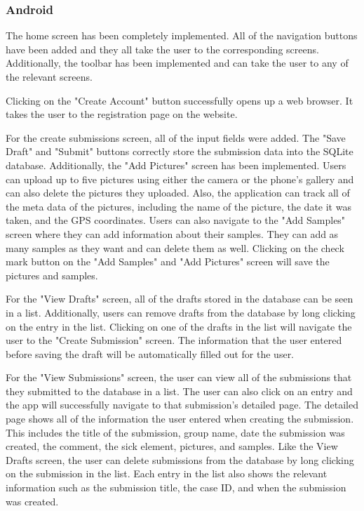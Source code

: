\documentclass[onecolumn, draftclsnofoot,10pt, compsoc]{IEEEtran}
\begin{document}
\subsubsection{Android}
The home screen has been completely implemented. All of the navigation buttons have been added and they all take the user to the corresponding screens. Additionally, the toolbar has been implemented and can take the user to any of the relevant screens.

Clicking on the "Create Account" button successfully opens up a web browser. It takes the user to the registration page on the website.

For the create submissions screen, all of the input fields were added. The "Save Draft" and "Submit" buttons correctly store the submission data into the SQLite database. Additionally, the "Add Pictures" screen has been implemented. Users can upload up to five pictures using either the camera or the phone's gallery and can also delete the pictures they uploaded. Also, the application can track all of the meta data of the pictures, including the name of the picture, the date it was taken, and the GPS coordinates. Users can also navigate to the "Add Samples" screen where they can add information about their samples. They can add as many samples as they want and can delete them as well. Clicking on the check mark button on the "Add Samples" and "Add Pictures" screen will save the pictures and samples.

For the "View Drafts" screen, all of the drafts stored in the database can be seen in a list. Additionally, users can remove drafts from the database by long clicking on the entry in the list. Clicking on one of the drafts in the list will navigate the user to the "Create Submission" screen. The information that the user entered before saving the draft will be automatically filled out for the user.

For the "View Submissions" screen, the user can view all of the submissions that they submitted to the database in a list. The user can also click on an entry and the app will successfully navigate to that submission's detailed page. The detailed page shows all of the information the user entered when creating the submission. This includes the title of the submission, group name, date the submission was created, the comment, the sick element, pictures, and samples. Like the View Drafts screen, the user can delete submissions from the database by long clicking on the submission in the list. Each entry in the list also shows the relevant information such as the submission title, the case ID, and when the submission was created.
\end{document}
